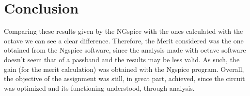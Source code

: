 \section{Conclusion}
\label{sec:conclusion}

Comparing these results given by the NGspice with the ones calculated with the octave we can see a clear difference. Therefore, the Merit considered was the one obtained from the Ngspice software, since the analysis made with octave software doesn't seem that of a passband and the results may be less valid. As such, the gain (for the merit calculation) was obtained with the Ngspice program. Overall, the objective of the assignment was still, in great part, achieved, since the circuit was optimized and its functioning understood, through analysis.